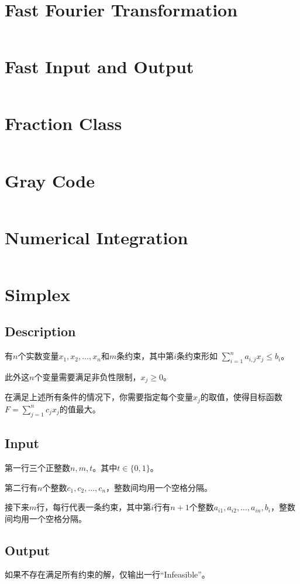 \documentclass[a4paper,openany]{book}
\newcommand{\cppcode}[1]
{
  \inputminted[mathescape,
  tabsize=4,
  linenos,
  framesep=2mm,
  breakaftergroup=true,
  breakautoindent=true,
  breakbytoken=true,
  breaklines=true,
  fontsize=\small
  ]{cpp}{source/#1}
}
\begin{document}
\section{Fast Fourier Transformation}
\cppcode{/Numerical Algorithms/Fast Fourier Transformation.cpp}
\section{Fast Input and Output}
\cppcode{/Numerical Algorithms/Fast Input and Output.cpp}
\section{Fraction Class}
\cppcode{/Numerical Algorithms/Fraction Class.cpp}
\section{Gray Code}
\cppcode{/Numerical Algorithms/Gray Code.cpp}
\section{Numerical Integration}
\cppcode{/Numerical Algorithms/Numerical Integration.cpp}
\section{Simplex}
\subsection{Description}
有$n$个实数变量$x_1,x_2,\ldots,x_n$和$m$条约束，其中第$i$条约束形如 $\sum_{i = 1}^{n}a_{i,j}x_j \leq b_i$。

此外这$n$个变量需要满足非负性限制，$x_j \geq 0$。

在满足上述所有条件的情况下，你需要指定每个变量$x_j$的取值，使得目标函数$F = \sum_{j = 1}^{n}c_jx_j$的值最大。

\subsection{Input}
第一行三个正整数$n,m,t$。其中$t \in \{ 0,1 \}$。

第二行有$n$个整数$c_1,c_2,\ldots,c_n$，整数间均用一个空格分隔。

接下来$m$行，每行代表一条约束，其中第$i$行有$n+1$个整数$a_{i1},a_{i2},\ldots,a_{in},b_i$，整数间均用一个空格分隔。
\subsection{Output}
如果不存在满足所有约束的解，仅输出一行``Infeasible''。
\end{document}
